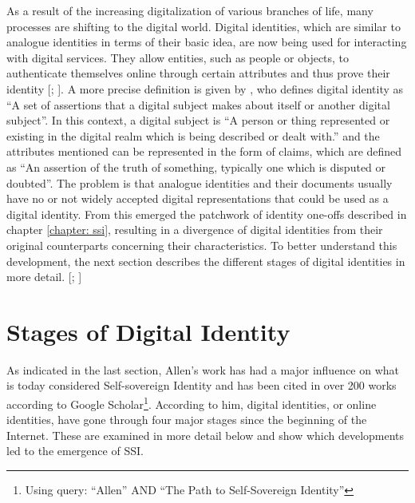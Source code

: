     As a result of the increasing digitalization of various branches of life, many processes are shifting to the digital world. Digital identities, which are similar to analogue identities in terms of their basic idea, are now being used for interacting with digital services. They allow entities, such as people or objects, to authenticate themselves online through certain attributes and thus prove their identity [\citealp[p. 103]{meinel_blockchain_2020}; \citealp{bundesdruckerei_so_2020}]. A more precise definition is given by \cite{cameron_laws_2005}, who defines digital identity as “A set of assertions that a digital subject makes about itself or another digital subject”. In this context, a digital subject is “A person or thing represented or existing in the digital realm which is being described or dealt with.” and the attributes mentioned can be represented in the form of claims, which are defined as “An assertion of the truth of something, typically one which is disputed or doubted”. The problem is that analogue identities and their documents usually have no or not widely accepted \cite{krempl_e-government-studie_2019, koppenhofer_kabinettsbeschluss_2021} digital representations that could be used as a digital identity. From this emerged the patchwork of identity one-offs described in chapter \ref{chapter: ssi}, resulting in a divergence of digital identities from their original counterparts concerning their characteristics. To better understand this development, the next section describes the different stages of digital identities in more detail. [\citealp[p. 10]{struker_grundlagen_2021}; \citealp[p. 2]{ehrlich_self-sovereign_2021}]
    
	\section{Stages of Digital Identity}
	
	As indicated in the last section, Allen's work \cite{allen_path_2016} has had a major influence on what is today considered Self-sovereign Identity and has been cited in over 200 works according to Google Scholar\footnote{Using query: “Allen” AND “The Path to Self-Sovereign Identity”}. According to him, digital identities, or online identities, have gone through four major stages since the beginning of the Internet. These are examined in more detail below and show which developments led to the emergence of \ac{SSI}.
	
